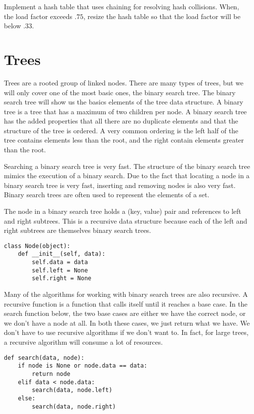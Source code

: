\begin{problem}
Implement a hash table that uses chaining for resolving hash collisions.
When, the load factor exceeds $.75$, resize the hash table so that the load factor will be below $.33$. 
\end{problem}

\section*{Trees}
Trees are a rooted group of linked nodes.  There are many types of trees, but we will only cover one of the most basic ones, the binary search tree.
The binary search tree will show us the basics elements of the tree data structure.
A binary tree is a tree that has a maximum of two children per node.
A binary search tree has the added properties that all there are no duplicate elements
and that the structure of the tree is ordered. 
A very common ordering is the left half of the tree contains elements less than the root, and the right contain elements greater than the root.

Searching a binary search tree is very fast.
The structure of the binary search tree mimics the execution of a binary search.
Due to the fact that locating a node in a binary search tree is very fast, inserting and removing nodes is also very fast.  
Binary search trees are often used to represent the elements of a set.

The node in a binary search tree holds a (key, value) pair and references to left and right subtrees. 
This is a recursive data structure because each of the left and right subtrees are themselves binary search trees.
\begin{lstlisting}
class Node(object):
    def __init__(self, data):
        self.data = data
        self.left = None
        self.right = None
\end{lstlisting}
Many of the algorithms for working with binary search trees are also recursive.
A recursive function is a function that calls itself until it reaches a base case.
In the search function below, the two base cases are either we have the correct
node, or we don't have a node at all. 
In both these cases, we just return what we have.
We don't have to use recursive algorithms if we don't want to.  In fact, for large trees, a recursive algorithm will consume a lot of resources.
\begin{lstlisting}
def search(data, node):
    if node is None or node.data == data:
        return node
    elif data < node.data:
        search(data, node.left)
    else:
        search(data, node.right)
\end{lstlisting}

